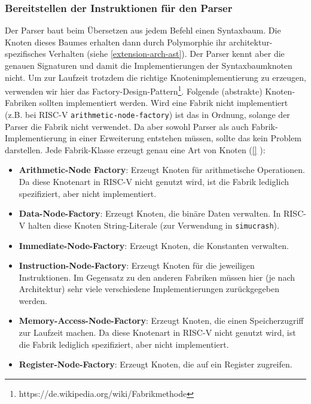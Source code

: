 \subsubsection{Bereitstellen der Instruktionen für den Parser}
\label{extension-arch-factories}
Der Parser baut beim Übersetzen aus jedem Befehl einen Syntaxbaum. Die Knoten dieses Baumes erhalten dann durch Polymorphie ihr architektur-spezifisches Verhalten (siehe \autoref{extension-arch-ast}). Der Parser kennt aber die genauen Signaturen und damit die Implementierungen der Syntaxbaumknoten nicht. Um zur Laufzeit trotzdem die richtige Knotenimplementierung zu erzeugen, verwenden wir hier das Factory-Design-Pattern\footnote{https://de.wikipedia.org/wiki/Fabrikmethode}. Folgende (abstrakte) Knoten-Fabriken sollten implementiert werden. Wird eine Fabrik nicht implementiert (z.B. bei RISC-V \texttt{arithmetic-node-factory}) ist das in Ordnung, solange der Parser die Fabrik nicht verwendet. Da aber sowohl Parser als auch Fabrik-Implementierung in einer Erweiterung entstehen müssen, sollte das kein Problem darstellen. Jede Fabrik-Klasse erzeugt genau eine Art von Knoten (\autoref{} ):
\begin{itemize}
	\item \textbf{Arithmetic-Node Factory}: Erzeugt Knoten für arithmetische Operationen. Da diese Knotenart in RISC-V nicht genutzt wird, ist die Fabrik lediglich spezifiziert, aber nicht implementiert.
	
	\item \textbf{Data-Node-Factory}: Erzeugt Knoten, die binäre Daten verwalten. In RISC-V halten diese Knoten String-Literale (zur Verwendung in \texttt{simucrash}).
	
	\item \textbf{Immediate-Node-Factory}: Erzeugt Knoten, die Konstanten verwalten. 
	
	\item \textbf{Instruction-Node-Factory}: Erzeugt Knoten für die jeweiligen Instruktionen. Im Gegensatz zu den anderen Fabriken müssen hier (je nach Architektur) sehr viele verschiedene Implementierungen zurückgegeben werden.
	
	\item \textbf{Memory-Access-Node-Factory}: Erzeugt Knoten, die einen Speicherzugriff zur Laufzeit machen. Da diese Knotenart in RISC-V nicht genutzt wird, ist die Fabrik lediglich spezifiziert, aber nicht implementiert.
	
	\item \textbf{Register-Node-Factory}: Erzeugt Knoten, die auf ein Register zugreifen.
\end{itemize}
